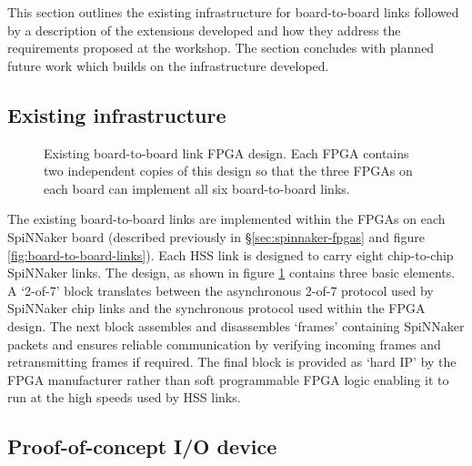 		This section outlines the existing infrastructure for board-to-board links
		followed by a description of the extensions developed and how they address
		the requirements proposed at the workshop. The section concludes with
		planned future work which builds on the infrastructure developed.
		
			\subsection{Existing infrastructure}
				
				
				\begin{figure}
					\center
					
					
					\caption[Existing board-to-board link FPGA design.]{Existing
					board-to-board link FPGA design. Each FPGA contains two independent
					copies of this design so that the three FPGAs on each board can
					implement all six board-to-board links.}
					\label{fig:existing-fpga-links}
				\end{figure}
				
				The existing board-to-board links are implemented within the FPGAs on
				each SpiNNaker board (described previously in
				\S\ref{sec:spinnaker-fpgas} and figure \ref{fig:board-to-board-links}).
				Each HSS link is designed to carry eight chip-to-chip SpiNNaker links.
				The design, as shown in figure \ref{fig:existing-fpga-links} contains
				three basic elements. A `2-of-7' block translates between the
				asynchronous 2-of-7 protocol used by SpiNNaker chip links and the
				synchronous protocol used within the FPGA design. The next block
				assembles and disassembles `frames' containing SpiNNaker packets and
				ensures reliable communication by verifying incoming frames and
				retransmitting frames if required. The final block is provided as `hard
				IP' by the FPGA manufacturer rather than soft programmable FPGA logic
				enabling it to run at the high speeds used by HSS links.
				
			\subsection{Proof-of-concept I/O device}
				
				
